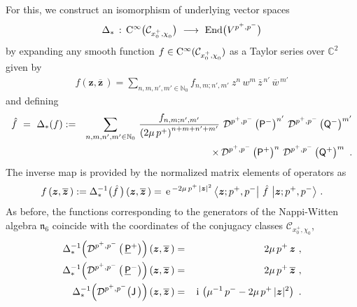 \documentclass[11pt,a4paper]{article}
\newcommand{\ii}{{\rm i}}
\newcommand{\mbf}[1]{{\boldsymbol {#1} }}
\def\ii{{\,{\rm i}\,}}
\def\P{{\sf P}}
\def\Q{{\sf Q}}
\def\J{{\sf J}}
\def\Pu{\underline{\sf P}{}}
\def\mz{{\mbf z}}
\def\mcDp{{\mathcal D}^{p^+,p^-}}
\newcommand{\complex}{{\mathbb C}} %
\newcommand{\nat}{{\mathbb N}} %
\def\e{{\,\rm e}\,}
\def\bea{\begin{eqnarray}}
\def\eea{\end{eqnarray}}
\newcommand{\beq}{\begin{eqnarray}}
\newcommand{\eeq}{\end{eqnarray}}
\begin{document}
For this, we construct an isomorphism of underlying vector spaces
\beq
\Delta_*\,:\,{\rm C}^\infty\bigl(\mathcal{C}_{x_0^+,\chi^{~}_0}\bigr)
{}~\longrightarrow~{\rm End}\bigl(V^{p^+,p^-}\bigr)
\label{Deltastar}\eeq
by expanding any smooth function $f\in{\rm
  C}^\infty(\mathcal{C}_{x_0^+,\chi^{~}_0})$ as a Taylor series over
$\complex^2$ given by
\beq
f\left(\mz,\overline{\mz}\,\right)=\sum_{n,m,n',m'\in\nat_0}f_{n,m;n',m'}~
z^n\,w^m\,\overline{z}{}^{\,n'}\,\overline{w}{}^{\,m'}
\label{TaylorD3}\eeq
and defining
\bea
\hat f~=~\Delta_*(f)&:=&\sum_{n,m,n',m'\in\nat_0}\,\frac{f_{n,m;n',m'}}
{\left(2\mu\,p^+\right)^{n+m+n'+m'}}~\mcDp\left(\P^-\right)^{n'}\,
\mcDp\left(\Q^-\right)^{m'}\nonumber\\ &&\times\,\mcDp\left(\P^+\right)^{n}\,
\mcDp\left(\Q^+\right)^{m} \ .
\label{DeltafD3}\eea
The inverse map is provided by the normalized matrix elements of
operators as
\beq
f\left(\mz,\overline{\mz}\,\right):=\Delta_*^{-1}\bigl(\hat f\,
\bigr)\left(\mz,\overline{\mz}\,\right)=\e^{-2\mu\,p^+\,|\mz|^2}\,
\bigl\langle\mz;p^+,p^-\bigl|~\hat f~\bigr|\mz;p^+,p^-\bigr\rangle \ .
\label{DeltainvD3}\eeq
As before, the functions corresponding to the generators of the
Nappi-Witten algebra $\mathfrak{n}_6$ coincide with the coordinates of
the conjugacy classes $\mathcal{C}_{x_0^+,\chi^{~}_0}$,
\bea
\Delta_*^{-1}\Bigl(\mcDp\left(\,\Pu^+\right)\Bigr)\left(\mz,
\overline{\mz}\,\right)&=&2\mu\,p^+\,\mz \ , \nonumber\\
\Delta_*^{-1}\Bigl(\mcDp\left(\,\Pu^-\right)\Bigr)\left(\mz,
\overline{\mz}\,\right)&=&2\mu\,p^+\,\overline{\mz} \ , \nonumber\\
\Delta_*^{-1}\Bigl(\mcDp\bigl(\J\,\bigr)\Bigr)\left(\mz,
\overline{\mz}\,\right)&=&
\ii\left(\mu^{-1}\,p^--2\mu\,p^+\,|\mz|^2\right) \ .
\label{DeltainvD3gens}\eea
\end{document}
